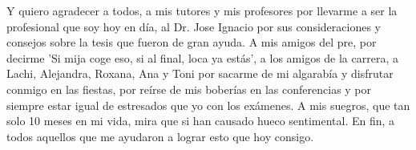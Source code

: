\begin{acknowledgements}
    Y quiero agradecer a todos, a mis tutores y mis profesores por llevarme a ser la profesional que soy hoy en día, al Dr. Jose Ignacio por sus consideraciones y consejos sobre la tesis que fueron de gran ayuda. A mis amigos del pre, por decirme 'Si mija coge eso, si al final, loca ya estás', a los amigos de la carrera, a Lachi, Alejandra, Roxana, Ana y Toni por sacarme de mi algarabía y disfrutar conmigo en las fiestas, por reírse de mis boberías en las conferencias y por siempre estar igual de estresados que yo con los exámenes. A mis suegros, que tan solo 10 meses en mi vida, mira que si han causado hueco sentimental. En fin, a todos aquellos que me ayudaron a lograr esto que hoy consigo.


\end{acknowledgements}